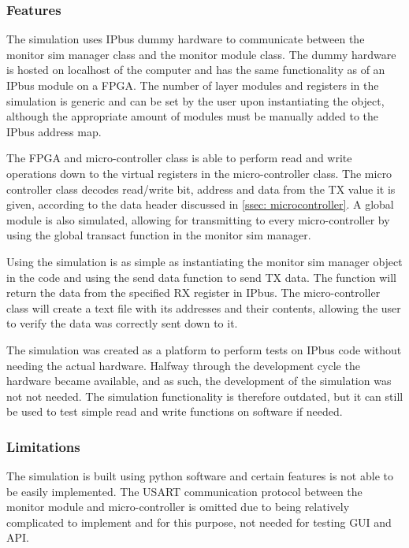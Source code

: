 \documentclass[main.tex]{subfiles}
\begin{document}

\subsubsection{Features}

The simulation uses IPbus dummy hardware to communicate between the monitor sim manager class and the monitor module class. The dummy hardware is hosted on localhost of the computer and has the same functionality as of an IPbus module on a FPGA.  The number of layer modules and registers in the simulation is generic and can be set by the user upon instantiating the object, although the appropriate amount of modules must be manually added to the IPbus address map.

The FPGA and micro-controller class is able to perform read and write operations down to the virtual registers in the micro-controller class. The micro controller class decodes read/write bit, address and data from the TX value it is given, according to the data header discussed in \autoref{ssec: microcontroller}. A global module is also simulated, allowing for transmitting to every micro-controller by using the global transact function in the monitor sim manager. 

Using the simulation is as simple as instantiating the monitor sim manager object in the code and using the send data function to send TX data. The function will return the data from the specified RX register in IPbus. The micro-controller class will create a text file with its addresses and their contents, allowing the user to verify the data was correctly sent down to it.

The simulation was created as a platform to perform tests on IPbus code without needing the actual hardware. Halfway through the development cycle the hardware became available, and as such, the development of the simulation was not not needed. The simulation functionality is therefore outdated, but it can still be used to test simple read and write functions on software if needed.

\subsubsection{Limitations}

The simulation is built using python software and certain features is not able to be easily implemented. The USART communication protocol between the monitor module and micro-controller is omitted due to being relatively complicated to implement and for this purpose, not needed for testing GUI and API. 
\end{document}
